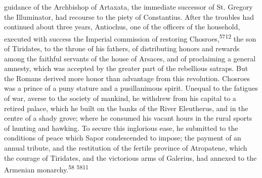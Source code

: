 guidance of the Archbishop of Artaxata, the immediate successor
of St. Gregory the Illuminator, had recourse to the piety of
Constantius. After the troubles had continued about three years,
Antiochus, one of the officers of the household, executed with
success the Imperial commission of restoring Chosroes,\textsuperscript{5712} the
son of Tiridates, to the throne of his fathers, of distributing
honors and rewards among the faithful servants of the house of
Arsaces, and of proclaiming a general amnesty, which was accepted
by the greater part of the rebellious satraps. But the Romans
derived more honor than advantage from this revolution. Chosroes
was a prince of a puny stature and a pusillanimous spirit.
Unequal to the fatigues of war, averse to the society of mankind,
he withdrew from his capital to a retired palace, which he built
on the banks of the River Eleutherus, and in the centre of a
shady grove; where he consumed his vacant hours in the rural
sports of hunting and hawking. To secure this inglorious ease, he
submitted to the conditions of peace which Sapor condescended to
impose; the payment of an annual tribute, and the restitution of
the fertile province of Atropatene, which the courage of
Tiridates, and the victorious arms of Galerius, had annexed to
the Armenian monarchy.\textsuperscript{58} \textsuperscript{5811}





